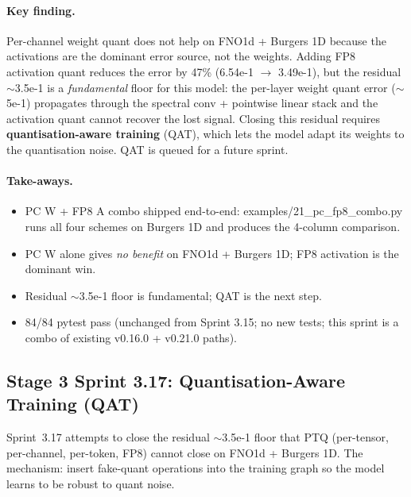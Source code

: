 \documentclass[10pt,twocolumn]{article}
\renewcommand{\texttt}[1]{{\normalfont\ttfamily #1}\normalfont\rmfamily}
\begin{document}
\paragraph{Key finding.}
Per-channel weight quant does not help on FNO1d
+ Burgers 1D because the activations are the
dominant error source, not the weights.  Adding
FP8 activation quant reduces the error by 47\%
(6.54e-1 $\to$ 3.49e-1), but the residual
$\sim$3.5e-1 is a \emph{fundamental} floor for
this model: the per-layer weight quant error
($\sim$5e-1) propagates through the spectral
conv + pointwise linear stack and the activation
quant cannot recover the lost signal.  Closing
this residual requires \textbf{quantisation-aware
training} (QAT), which lets the model adapt its
weights to the quantisation noise.  QAT is
queued for a future sprint.

\paragraph{Take-aways.}
\begin{itemize}
\item PC W + FP8 A combo shipped end-to-end:
\texttt{examples/21\_pc\_fp8\_combo.py} runs all
four schemes on Burgers 1D and produces the
4-column comparison.
\item PC W alone gives \emph{no benefit} on
FNO1d + Burgers 1D; FP8 activation is the
dominant win.
\item Residual $\sim$3.5e-1 floor is fundamental;
QAT is the next step.
\item 84/84 pytest pass (unchanged from Sprint
3.15; no new tests; this sprint is a combo of
existing v0.16.0 + v0.21.0 paths).
\end{itemize}

\subsection{Stage 3 Sprint 3.17: Quantisation-Aware Training (QAT)}
\label{sec:qat}

Sprint~3.17 attempts to close the residual
$\sim$3.5e-1 floor that PTQ (per-tensor, per-channel,
per-token, FP8) cannot close on FNO1d + Burgers 1D.
The mechanism: insert fake-quant operations into
the training graph so the model learns to be
robust to quant noise.
\end{document}
